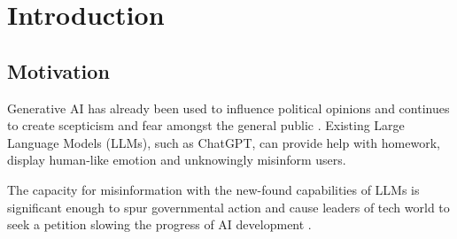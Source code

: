 \documentclass{l4proj}
\theoremstyle{definition}
\begin{document}
\educationalconsent


\tableofcontents

%
%
%
%
%

\chapter{Introduction}
    \label{chap:introduction}
    

    \section{Motivation}
        Generative AI has already been used to influence political opinions and continues to create scepticism and fear amongst the general public \citep{leffer2024anxiety}. Existing Large Language Models (LLMs), such as ChatGPT, can provide help with homework, display human-like emotion and unknowingly misinform users.
    
        The capacity for misinformation with the new-found capabilities of LLMs is significant enough to spur governmental action \citep{whitehouse2023ai} and cause leaders of tech world to seek a petition slowing the progress of AI development \citep{life2024pauseai}.
        
\end{document}
